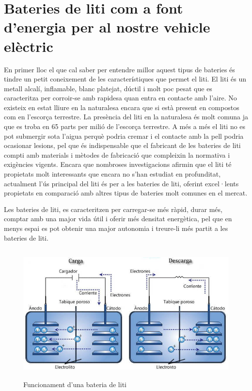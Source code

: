 \section{Bateries de liti com a font d'energia per al nostre vehicle elèctric}
En primer lloc el que cal saber per entendre millor aquest tipus de bateries és tindre un petit coneixement de les característiques que permet el liti. El liti és un metall alcalí, inflamable, blanc platejat, dúctil i molt poc pesat que es caracteritza per corroir-se amb rapidesa quan entra en contacte amb l’aire. No existeix en estat lliure en la naturalesa encara que si està present en compostos com en l'escorça terrestre. La presència del liti en la naturalesa és molt comuna ja que es troba en 65 parts per milió de l'escorça terrestre. A més a més el liti no es pot submergir sota l’aigua perquè podria cremar i el contacte amb la pell podria ocasionar lesions, pel que és indispensable que el fabricant de les bateries de liti compti amb materials i mètodes de fabricació que compleixin la normativa i exigències vigents. Encara que nombroses investigacions afirmin que el liti té propietats molt interessants que encara no s’han estudiat en profunditat, actualment l’ús principal del liti és per a les bateries de liti, oferint excel·lents propietats en comparació amb altres tipus de bateries molt comunes en el mercat.

Les bateries de liti, es caracteritzen per carregar-se més ràpid, durar més, comptar amb una major vida útil i oferir més densitat energètica, pel que en menys espai es pot obtenir una major autonomia i treure-li més partit a les bateries de liti.

\begin{figure}[H]
	\centering
    \includegraphics[width=\textwidth, height=7cm] {Bateries/cargadescargalitio.jpg}
    \caption{Funcionament d'una bateria de liti}
\end{figure}

